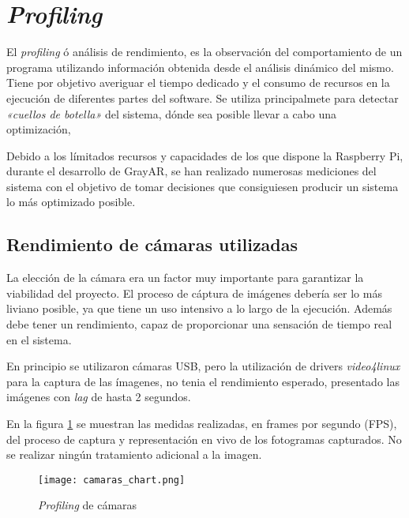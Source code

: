 \section{\textit{Profiling}}

El \textit{profiling} ó análisis de rendimiento, es la observación del comportamiento de un programa utilizando información obtenida desde el análisis dinámico del mismo. Tiene por objetivo averiguar el tiempo dedicado y el consumo de recursos en la ejecución de diferentes partes del software. Se utiliza principalmete para detectar \textit{«cuellos de botella»} del sistema, dónde sea posible llevar a cabo una optimización,

Debido a los límitados recursos y capacidades de los que dispone la Raspberry Pi, durante el desarrollo de GrayAR, se han realizado numerosas mediciones del sistema con el objetivo de tomar decisiones que consiguiesen producir un sistema lo más optimizado posible.

\subsection{Rendimiento de cámaras utilizadas}
La elección de la cámara era un factor muy importante para garantizar la viabilidad del proyecto. El proceso de cáptura de imágenes debería ser lo más liviano posible, ya que tiene un uso intensivo a lo largo de la ejecución. Además debe tener un rendimiento, capaz de proporcionar una sensación de tiempo real en el sistema. 

En principio se utilizaron cámaras USB, pero la utilización de drivers \textit{video4linux} para la captura de las ímagenes, no tenia el rendimiento esperado, presentado las imágenes con \textit{lag} de hasta 2 segundos.

En la figura \ref{fig:camaras_chart} se muestran las medidas realizadas, en frames por segundo (FPS), del proceso de captura y representación en vivo de los fotogramas capturados. No se realizar ningún tratamiento adicional a la imagen.

\begin{figure}
  \begin{center}
    \texttt{[image: camaras\_chart.png]}
    \caption{\textit{Profiling} de cámaras}
    \label{fig:camaras_chart}
  \end{center}
\end{figure}


